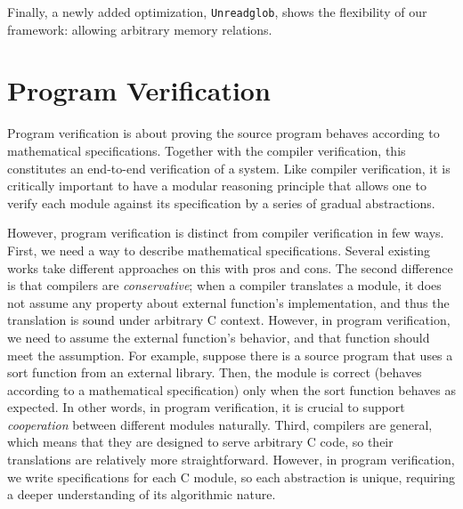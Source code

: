 Finally, a newly added optimization, \texttt{Unreadglob}, shows the flexibility of our framework:
allowing arbitrary memory relations.





\section{Program Verification}\label{sec:overview:program}

Program verification is about proving the source program behaves according to mathematical specifications.
Together with the compiler verification, this constitutes an end-to-end verification of a system.
Like compiler verification, it is critically important to have a modular reasoning principle that allows one to verify each module against its specification by a series of gradual abstractions. 

However, program verification is distinct from compiler verification in few ways.
%
First, we need a way to describe mathematical specifications. Several existing works \cite{lorch:armada, jung:irisjfp, VST, gu:dscal} take different approaches on this with pros and cons.
%
The second difference is that compilers are {\it conservative}; when a compiler translates a module, it does not assume any property about external function's implementation, and thus the translation is sound under arbitrary C context.
However, in program verification, we need to assume the external function's behavior, and that function should meet the assumption.
For example, suppose there is a source program that uses a sort function from an external library.
Then, the module is correct (behaves according to a mathematical specification) only when the sort function behaves as expected.
In other words, in program verification, it is crucial to support {\it cooperation} between different modules naturally.
%
Third, compilers are general, which means that they are designed to serve arbitrary C code, so their translations are relatively more straightforward.
However, in program verification, we write specifications for each C module, so each abstraction is unique, requiring a deeper understanding of its algorithmic nature. 



